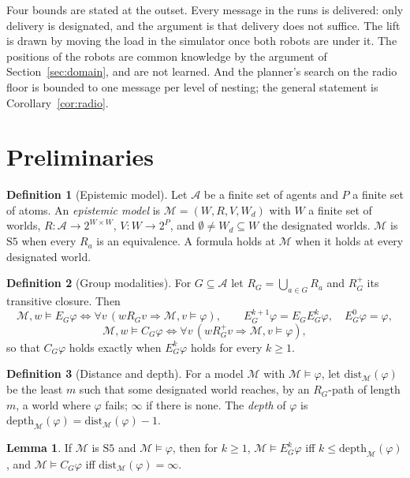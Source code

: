 \documentclass[11pt,a4paper]{article}
\theoremstyle{definition}
\newtheorem{definition}{Definition}
\newtheorem{lemma}{Lemma}
\newcommand{\Ag}{\mathcal{A}}
\newcommand{\Mod}{\mathcal{M}}
\newcommand{\Eop}[1]{E_{#1}}
\newcommand{\Cop}[1]{C_{#1}}
\newcommand{\dist}{\mathrm{dist}}
\newcommand{\depth}{\mathrm{depth}}
\begin{document}
Four bounds are stated at the outset. Every message in the runs is delivered:
only delivery is designated, and the argument is that delivery does not
suffice. The lift is drawn by moving the load in the simulator once both robots
are under it. The positions of the robots are common knowledge by the argument
of Section~\ref{sec:domain}, and are not learned. And the planner's search on
the radio floor is bounded to one message per level of nesting; the general
statement is Corollary~\ref{cor:radio}.

\section{Preliminaries}
\label{sec:prelim}

\begin{definition}[Epistemic model]
Let $\Ag$ be a finite set of agents and $P$ a finite set of atoms. An
\emph{epistemic model} is $\Mod = (W, R, V, W_d)$ with $W$ a finite set of
worlds, $R : \Ag \to 2^{W\times W}$, $V : W \to 2^P$, and
$\emptyset \neq W_d \subseteq W$ the designated worlds. $\Mod$ is
$\mathrm{S5}$ when every $R_a$ is an equivalence. A formula holds at $\Mod$ when
it holds at every designated world.
\end{definition}

\begin{definition}[Group modalities]
For $G \subseteq \Ag$ let $R_G = \bigcup_{a\in G} R_a$ and $R_G^+$ its
transitive closure. Then
\[
  \Mod, w \models \Eop{G}\varphi \iff \forall v\,(w R_G v \Rightarrow \Mod, v \models \varphi),
  \qquad
  \Eop{G}^{k+1}\varphi = \Eop{G}\Eop{G}^{k}\varphi,\quad \Eop{G}^0\varphi = \varphi,
\]
\[
  \Mod, w \models \Cop{G}\varphi \iff \forall v\,(w R_G^+ v \Rightarrow \Mod, v \models \varphi),
\]
so that $\Cop{G}\varphi$ holds exactly when $\Eop{G}^k\varphi$ holds for every
$k \geq 1$.
\end{definition}

\begin{definition}[Distance and depth]
\label{def:depth}
For a model $\Mod$ with $\Mod \models \varphi$, let $\dist_\Mod(\varphi)$ be the
least $m$ such that some designated world reaches, by an $R_G$-path of length
$m$, a world where $\varphi$ fails; $\infty$ if there is none. The
\emph{depth} of $\varphi$ is $\depth_\Mod(\varphi) = \dist_\Mod(\varphi) - 1$.
\end{definition}

\begin{lemma}
\label{lem:depth}
If $\Mod$ is $\mathrm{S5}$ and $\Mod \models \varphi$, then for $k \geq 1$,
$\Mod \models \Eop{G}^k\varphi$ iff $k \leq \depth_\Mod(\varphi)$, and
$\Mod \models \Cop{G}\varphi$ iff $\dist_\Mod(\varphi) = \infty$.
\end{lemma}
\end{document}
